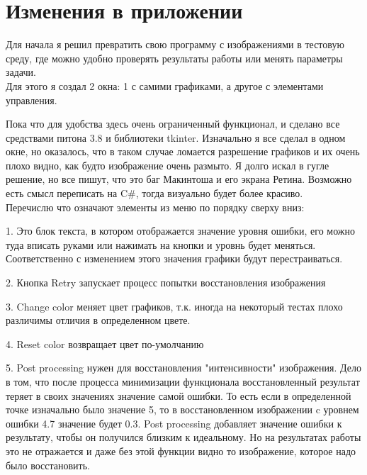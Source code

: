 \documentclass{report}
\newcommand{\ttt}{\hspace*{4mm}}
\begin{document}
\section*{Изменения в приложении}
\ttt
	Для начала я решил превратить свою программу с изображениями в тестовую среду, где можно удобно проверять результаты работы или менять параметры задачи.\\
\ttt
	Для этого я создал 2 окна: 1 с самими графиками, а другое с элементами управления.
		
\flushleft
\ttt
Пока что для удобства здесь очень ограниченный функционал, и сделано все средствами питона 3.8 и библиотеки tkinter. Изначально я все сделал в одном окне, но оказалось, что в таком случае ломается разрешение графиков и их очень плохо видно, как будто изображение очень размыто. Я долго искал в гугле решение, но все пишут, что это баг Макинтоша и его экрана Ретина. Возможно есть смысл переписать на C{\lserif\#}, тогда визуально будет более красиво.\\
\bigskip
Перечислю что означают элементы из меню по порядку сверху вниз:
\item 1. Это блок текста, в котором отображается 
значение уровня ошибки, его можно туда вписать руками или нажимать на кнопки и уровнь будет меняться. Соответственно с изменением этого значения графики будут перестраиваться.
\item 2. Кнопка Retry запускает процесс попытки восстановления изображения
\item 3. Change color меняет цвет графиков, т.к. иногда на некоторый тестах плохо различимы отличия в определенном цвете.
\item 4. Reset color возвращает цвет по-умолчанию
\item 5. Post processing нужен для восстановления "интенсивности" \space изображения. Дело в том, что после процесса минимизации функционала восстановленный результат теряет в своих значениях значение самой ошибки. То есть если в определенной точке изначально было значение 5, то в восстановленном изображении c уровнем ошибки 4.7 значение будет 0.3. Post processing добавляет значение ошибки к результату, чтобы он получился близким к идеальному. Но на результатах работы это не отражается и даже без этой функции видно то изображение, которое надо было восстановить.
\end{document}

